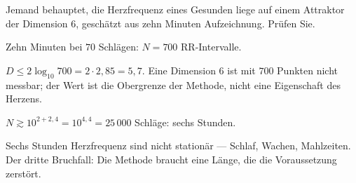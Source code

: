 \begin{aufgabe}
Jemand behauptet, die Herzfrequenz eines Gesunden liege auf einem Attraktor der Dimension $6$, geschätzt aus zehn Minuten Aufzeichnung. Prüfen Sie.

\loesung
{}
Zehn Minuten bei $70$ Schlägen: $N = 700$ RR-Intervalle.

$D \le 2\log_{10}700 = 2\cdot2{,}85 = 5{,}7$. Eine Dimension $6$ ist mit $700$ Punkten nicht messbar; der Wert ist die Obergrenze der Methode, nicht eine Eigenschaft des Herzens.

$N \gtrsim 10^{2 + 2{,}4} = 10^{4{,}4} = 25\,000$ Schläge: sechs Stunden.

Sechs Stunden Herzfrequenz sind nicht stationär --- Schlaf, Wachen, Mahlzeiten. Der dritte Bruchfall: Die Methode braucht eine Länge, die die Voraussetzung zerstört.

\begin{center}
\begin{minipage}{0.88\textwidth}
\end{minipage}
\end{center}
\end{aufgabe}

